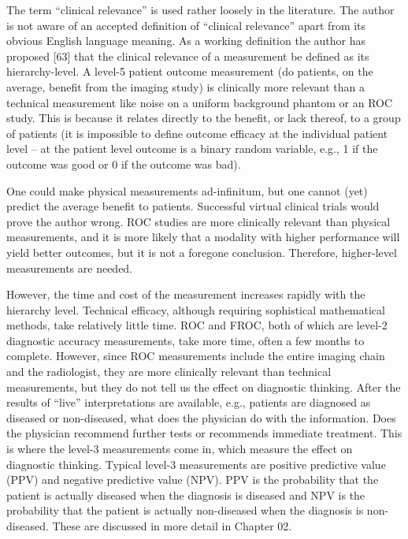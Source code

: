 \documentclass[
]{book}
\begin{document}
The term ``clinical relevance'' is used rather loosely in the literature. The author is not aware of an accepted definition of ``clinical relevance'' apart from its obvious English language meaning. As a working definition the author has proposed {[}63{]} that the clinical relevance of a measurement be defined as its hierarchy-level. A level-5 patient outcome measurement (do patients, on the average, benefit from the imaging study) is clinically more relevant than a technical measurement like noise on a uniform background phantom or an ROC study. This is because it relates directly to the benefit, or lack thereof, to a group of patients (it is impossible to define outcome efficacy at the individual patient level -- at the patient level outcome is a binary random variable, e.g., 1 if the outcome was good or 0 if the outcome was bad).

One could make physical measurements ad-infinitum, but one cannot (yet) predict the average benefit to patients. Successful virtual clinical trials would prove the author wrong. ROC studies are more clinically relevant than physical measurements, and it is more likely that a modality with higher performance will yield better outcomes, but it is not a foregone conclusion. Therefore, higher-level measurements are needed.

However, the time and cost of the measurement increases rapidly with the hierarchy level. Technical efficacy, although requiring sophistical mathematical methods, take relatively little time. ROC and FROC, both of which are level-2 diagnostic accuracy measurements, take more time, often a few months to complete. However, since ROC measurements include the entire imaging chain and the radiologist, they are more clinically relevant than technical measurements, but they do not tell us the effect on diagnostic thinking. After the results of ``live'' interpretations are available, e.g., patients are diagnosed as diseased or non-diseased, what does the physician do with the information. Does the physician recommend further tests or recommends immediate treatment. This is where the level-3 measurements come in, which measure the effect on diagnostic thinking. Typical level-3 measurements are positive predictive value (PPV) and negative predictive value (NPV). PPV is the probability that the patient is actually diseased when the diagnosis is diseased and NPV is the probability that the patient is actually non-diseased when the diagnosis is non-diseased. These are discussed in more detail in Chapter 02.
\end{document}
